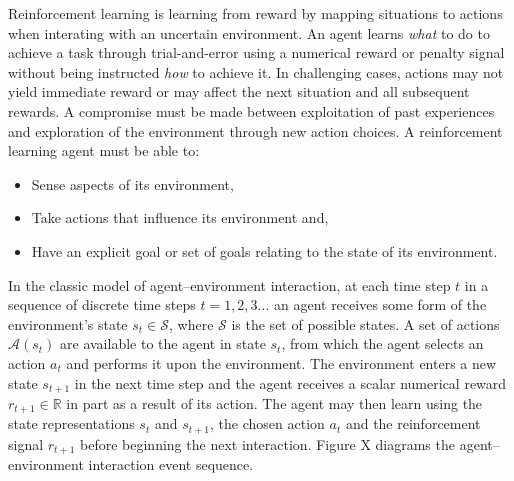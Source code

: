 Reinforcement learning is learning from reward by mapping situations to actions
when interating with an uncertain environment.  An agent learns \textit{what}
to do to achieve a task through trial-and-error using a numerical reward or
penalty signal without being instructed \textit{how} to achieve it.  In
challenging cases, actions may not yield immediate reward or may affect the
next situation and all subsequent rewards.  A compromise must be made between
exploitation of past experiences and exploration of the environment through new
action choices.  A reinforcement learning agent must be able to:
\begin{itemize}
  \item Sense aspects of its environment,
  \item Take actions that influence its environment and,
  \item Have an explicit goal or set of goals relating to the state of its
  environment.
\end{itemize}
In the classic model of agent--environment interaction, at each time step $t$
in a sequence of discrete time steps $t = 1,2,3\dotsc$ an agent receives
some form of the environment's state $s_t \in \mathscr{S}$, where $\mathscr{S}$
is the set of possible states.  A set of actions $\mathscr{A}(s_t)$ are
available to the agent in state $s_t$, from which the agent selects an action
$a_t$ and performs it upon the environment.  The environment enters a new state
$s_{t+1}$ in the next time step and the agent receives a scalar numerical
reward $r_{t+1} \in \mathbb{R}$ in part as a result of its action.  The agent
may then learn using the state representations $s_t$ and $s_{t+1}$, the chosen
action $a_t$ and the reinforcement signal $r_{t+1}$ before beginning the next
interaction.  Figure X diagrams the agent--environment interaction event
sequence.

